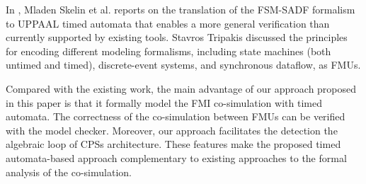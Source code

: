 In \cite{SkelinWOHL15}, Mladen Skelin et al. reports on the translation of the FSM-SADF formalism to UPPAAL timed automata that enables a more general
verification than currently supported by existing tools. Stavros Tripakis \cite{Tripakis15} discussed the principles for encoding different modeling formalisms, including state machines (both untimed and timed), discrete-event systems, and synchronous dataflow, as FMUs.

Compared with the existing work, the main advantage of our approach proposed in this paper is that it formally model the FMI co-simulation with timed automata. The correctness of the co-simulation between FMUs can be verified with the model checker. Moreover, our approach facilitates the detection the algebraic loop of CPSs architecture. These features make the proposed timed automata-based approach complementary to existing
approaches to the formal analysis of the co-simulation.


